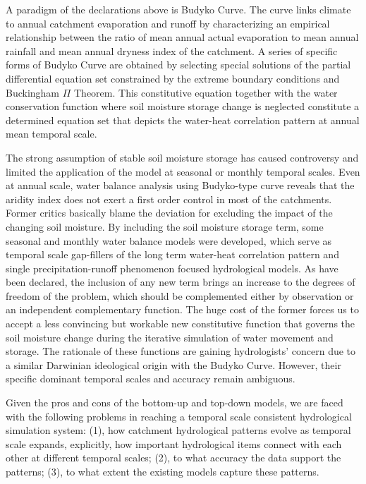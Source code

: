 \documentclass[review]{elsarticle}
\begin{document}
A paradigm of the declarations above is Budyko Curve\citep{budyko1961heat}. The curve links climate to annual catchment evaporation and runoff by characterizing an empirical relationship between the ratio of mean annual actual evaporation to mean annual rainfall and mean annual dryness index of the catchment\citep{wang2012responses}. A series of specific forms of Budyko Curve are obtained by selecting special solutions of the partial differential equation set constrained  by the extreme boundary conditions and Buckingham $\Pi$ Theorem\citep{FuBaopu,choudhury1999evaluation,yang2008new}. This constitutive equation together with the water conservation function where soil moisture storage change is neglected constitute a determined equation set that depicts the water-heat correlation pattern at annual mean temporal scale\citep{zhang2001response,yang2007analyzing}. 

The strong assumption of stable soil moisture storage has caused controversy and limited the application of the model at seasonal or monthly temporal scales. Even at annual scale, water balance analysis using Budyko-type curve reveals that the aridity index does not exert a first order control in most of the catchments\citep{tekleab2011water}. Former critics basically blame the deviation for excluding the impact of the changing soil moisture\citep{sankarasubramanian2002annual,sankarasubramanian2003hydroclimatology}. By including the soil moisture storage term, some seasonal and monthly water balance models were developed\citep{abcd,xiong1999two,zhang2008water}, which serve as  temporal scale gap-fillers of the long term water-heat correlation pattern and single precipitation-runoff phenomenon focused hydrological models. As have been declared, the inclusion of any new term brings an increase to the degrees of freedom of the problem, which should be complemented either by observation or an independent complementary function. The huge cost of the former forces us to accept a less convincing but workable new constitutive function that governs the soil moisture change during the iterative simulation of water movement and storage. The rationale of these functions are gaining hydrologists' concern due to a similar Darwinian ideological origin with the Budyko Curve\citep{wang2014one}. However, their specific dominant temporal scales and accuracy remain ambiguous. 

Given the pros and cons of the bottom-up and top-down models, we are faced with the following problems in reaching a temporal scale consistent hydrological simulation system: (1), how catchment hydrological patterns evolve as temporal scale expands, explicitly, how important hydrological items connect with each other at different temporal scales; (2), to what accuracy the data support the patterns; (3), to what extent the existing models capture these patterns.
\end{document}
